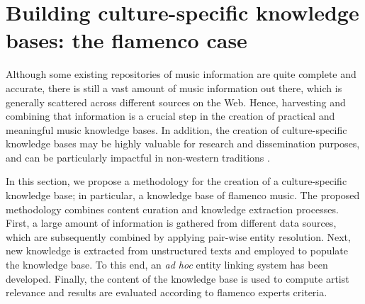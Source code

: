 \section{Building culture-specific knowledge bases: the flamenco case}
\label{sec:musicology:flamenco-kb}


Although some existing repositories of music information are quite complete and accurate, there is still a vast amount of music information out there, which is generally scattered across different sources on the Web. Hence, harvesting and combining that information is a crucial step in the creation of practical and meaningful music knowledge bases. In addition, the creation of culture-specific knowledge bases may be highly valuable for research and dissemination purposes, and can be particularly impactful in non-western traditions \citep{Serra2014compmusic}. 

In this section, we propose a methodology for the creation of a culture-specific knowledge base; in particular, a knowledge base of flamenco music. The proposed methodology combines content curation and knowledge extraction processes. First, a large amount of information is gathered from different data sources, which are subsequently combined by applying pair-wise entity resolution. Next, new knowledge is extracted from unstructured texts and employed to populate the knowledge base. To this end, an \textit{ad hoc} entity linking system has been developed. Finally, the content of the knowledge base is used to compute artist relevance and results are evaluated according to flamenco experts criteria. %


